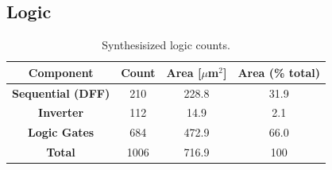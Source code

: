 \FloatBarrier\subsection{Logic}

		\begin{table}[htb!]
			\centering
			\def\arraystretch{1.5}		
			\setlength\arrayrulewidth{0.75pt}
			\setlength{\tabcolsep}{1em} %
			\begin{tabular}{|c|c|c|c|}
				\hline 
				\rule[-1ex]{0pt}{2.5ex} \cellcolor{gray!40}\textbf{Component} & \cellcolor{gray!40}\textbf{Count } & \cellcolor{gray!40}\textbf{Area [$\mu$m$^2$]}& \cellcolor{gray!40}\textbf{Area (\% total)}\\ 
				\hline 
				\rule[-1ex]{0pt}{2.5ex} \textbf{Sequential (DFF)} &  210 & 228.8 & 31.9 \\ 
				\hline 
				\rule[-1ex]{0pt}{2.5ex} \textbf{Inverter} & 112 & 14.9 & 2.1  \\ 
				\hline 
				\rule[-1ex]{0pt}{2.5ex} \textbf{Logic Gates} & 684 & 472.9 & 66.0  \\ 
				\hline 
				\rule[-1ex]{0pt}{2.5ex} \textbf{Total} & 1006 & 716.9 & 100  \\ 
				\hline 
			\end{tabular} 
			\caption{Synthesisized logic counts.}
			\label{tab:log_synth}
		\end{table}   



